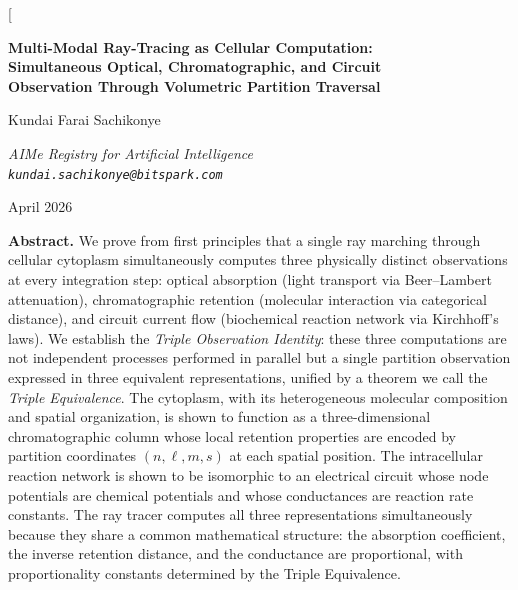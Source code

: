 \documentclass[11pt,twocolumn,a4paper]{article}
\begin{document}
\twocolumn[
\begin{@twocolumnfalse}
\begin{center}

{\LARGE\bfseries Multi-Modal Ray-Tracing as Cellular Computation:\\[4pt]
Simultaneous Optical, Chromatographic, and Circuit\\[4pt]
Observation Through Volumetric Partition Traversal}

\vspace{12pt}

{\large Kundai Farai Sachikonye}

\vspace{6pt}

{\small\itshape AIMe Registry for Artificial Intelligence\\[0.3em]
\texttt{kundai.sachikonye@bitspark.com}}

\vspace{6pt}

{\small April 2026}

\vspace{14pt}

\begin{minipage}{0.92\textwidth}
\textbf{Abstract.}
We prove from first principles that a single ray marching through
cellular cytoplasm simultaneously computes three physically distinct
observations at every integration step: optical absorption (light
transport via Beer--Lambert attenuation), chromatographic retention
(molecular interaction via categorical distance), and circuit current
flow (biochemical reaction network via Kirchhoff's laws). We establish
the \emph{Triple Observation Identity}: these three computations are
not independent processes performed in parallel but a single partition
observation expressed in three equivalent representations, unified by a
theorem we call the \emph{Triple Equivalence}. The cytoplasm, with its
heterogeneous molecular composition and spatial organization, is shown
to function as a three-dimensional chromatographic column whose local
retention properties are encoded by partition coordinates
$(n,\ell,m,s)$ at each spatial position. The intracellular reaction
network is shown to be isomorphic to an electrical circuit whose node
potentials are chemical potentials and whose conductances are reaction
rate constants. The ray tracer computes all three representations
simultaneously because they share a common mathematical structure: the
absorption coefficient, the inverse retention distance, and the
conductance are proportional, with proportionality constants determined
by the Triple Equivalence.


\end{minipage}
\end{center}
\end{@twocolumnfalse}
\end{document}
